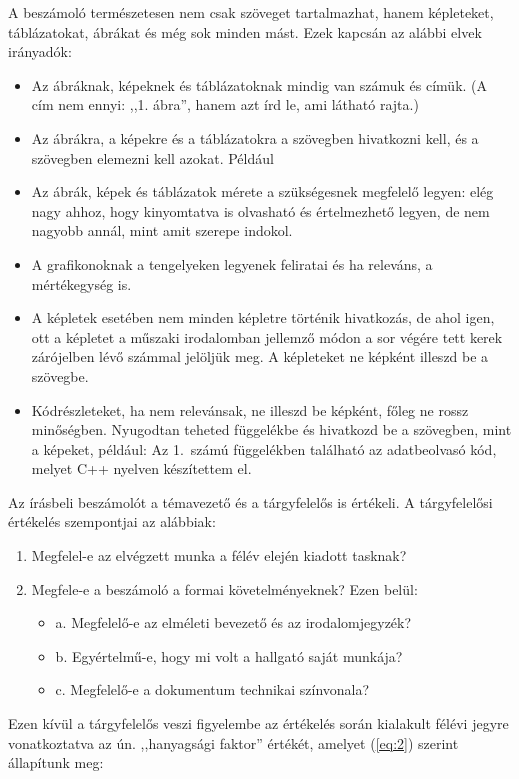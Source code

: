 \documentclass[11pt,a4paper,oneside]{article}
\begin{document}
A beszámoló természetesen nem csak szöveget tartalmazhat, hanem
képleteket, táblázatokat, ábrákat és még sok minden mást.  Ezek
kapcsán az alábbi elvek irányadók:
\begin{itemize}
\item Az ábráknak, képeknek és táblázatoknak mindig van számuk és
  címük. (A cím nem ennyi: ,,1. ábra'', hanem azt írd le, ami látható
  rajta.)

\item Az ábrákra, a képekre és a táblázatokra a szövegben hivatkozni
  kell, és a szövegben elemezni kell azokat. Például

\item Az ábrák, képek és táblázatok mérete a szükségesnek megfelelő
  legyen: elég nagy ahhoz, hogy kinyomtatva is olvasható és
  értelmezhető legyen, de nem nagyobb annál, mint amit szerepe
  indokol.

\item A grafikonoknak a tengelyeken legyenek feliratai és ha releváns,
  a mértékegység is.

\item A képletek esetében nem minden képletre történik hivatkozás, de
  ahol igen, ott a képletet a műszaki irodalomban jellemző módon a sor
  végére tett kerek zárójelben lévő számmal jelöljük meg.  A
  képleteket ne képként illeszd be a szövegbe.

\item Kódrészleteket, ha nem relevánsak, ne illeszd be képként, főleg
  ne rossz minőségben. Nyugodtan teheted függelékbe és hivatkozd be a
  szövegben, mint a képeket, például: Az 1.~számú függelékben
  található az adatbeolvasó kód, melyet C++ nyelven készítettem el.
\end{itemize}

Az írásbeli beszámolót a témavezető és a tárgyfelelős is értékeli. A
tárgyfelelősi értékelés szempontjai az alábbiak:
\begin{enumerate}
\item Megfelel-e az elvégzett munka a félév elején kiadott tasknak?
\item Megfele-e a beszámoló a formai követelményeknek? Ezen belül:
  \begin{itemize}
  \item a. Megfelelő-e az elméleti bevezető és az irodalomjegyzék?
  \item b. Egyértelmű-e, hogy mi volt a hallgató saját munkája?
  \item c. Megfelelő-e a dokumentum technikai színvonala?
  \end{itemize}

\end{enumerate}
Ezen kívül a tárgyfelelős veszi figyelembe az értékelés során
kialakult félévi jegyre vonatkoztatva az ún. ,,hanyagsági faktor''
értékét, amelyet (\ref{eq:2}) szerint állapítunk meg:
\end{document}
